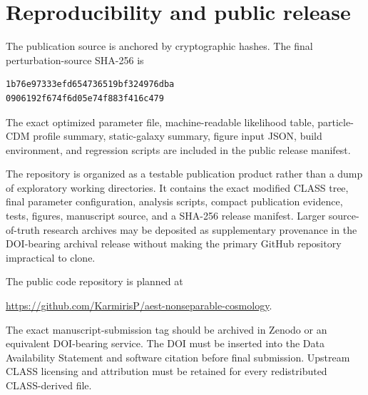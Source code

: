 \section{Reproducibility and public release}\label{app:repro}
The publication source is anchored by cryptographic hashes. The final perturbation-source SHA-256 is
\begin{verbatim}
1b76e97333efd654736519bf324976dba
0906192f674f6d05e74f883f416c479
\end{verbatim}
The exact optimized parameter file, machine-readable likelihood table, particle-CDM profile summary, static-galaxy summary, figure input JSON, build environment, and regression scripts are included in the public release manifest.

The repository is organized as a testable publication product rather than a dump of exploratory working directories. It contains the exact modified CLASS tree, final parameter configuration, analysis scripts, compact publication evidence, tests, figures, manuscript source, and a SHA-256 release manifest. Larger source-of-truth research archives may be deposited as supplementary provenance in the DOI-bearing archival release without making the primary GitHub repository impractical to clone.

The public code repository is planned at
\begin{center}
\url{https://github.com/KarmirisP/aest-nonseparable-cosmology}.
\end{center}
The exact manuscript-submission tag should be archived in Zenodo or an equivalent DOI-bearing service. The DOI must be inserted into the Data Availability Statement and software citation before final submission. Upstream CLASS licensing and attribution must be retained for every redistributed CLASS-derived file.
